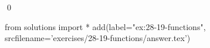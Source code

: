 
\begin{ex}
  \label{ex:28-19-functions}
  
  \qed
\end{ex}
\begin{python0}
from solutions import *
add(label="ex:28-19-functions",
    srcfilename='exercises/28-19-functions/answer.tex')
\end{python0}
